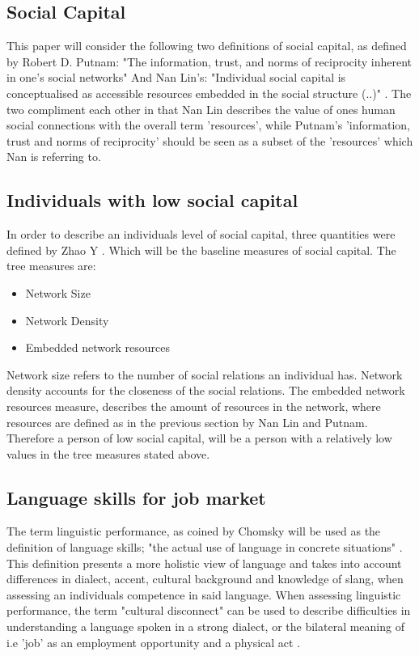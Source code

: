 \subsection{Social Capital}
This paper will consider the following two definitions of social capital, as defined by Robert D. Putnam: "The information, trust, and norms of reciprocity inherent in one's social networks" \cite{Putnam1995} And Nan Lin's: "Individual social capital is conceptualised as accessible resources embedded in the social structure (..)" \cite{Nan2001}. The two compliment each other in  that Nan Lin describes the value of ones human social connections with the overall term 'resources', while Putnam's 'information, trust and norms of reciprocity' should be seen as a subset of the 'resources' which Nan is referring to. 

\subsection{Individuals with low social capital} In order to describe an individuals level of social capital, three quantities were defined by Zhao Y \cite{Zhao2002}. Which will be the baseline measures of social capital. The tree measures are:
\begin{itemize}
    \item Network Size
    \item Network Density
    \item Embedded network resources
\end{itemize}Network size refers to the number of social relations an individual has. Network density accounts for the closeness of the social relations. The embedded network resources measure, describes the amount of resources in the network, where resources are defined as in the previous section by Nan Lin and Putnam. Therefore a person of low social capital, will be a person with a relatively low values in the tree measures stated above.

\subsection{Language skills for job market}
The term linguistic performance, as coined by Chomsky will be used as the definition of language skills; "the actual use of language in concrete situations" \cite{Chomsky1965}. This definition presents a more holistic view of language and takes into account differences in dialect, accent, cultural background and knowledge of slang, when assessing an individuals competence in said language. When assessing linguistic performance, the term "cultural disconnect" can be used to describe difficulties in understanding a language spoken in a strong dialect, or the bilateral meaning of i.e 'job' as an employment opportunity and a physical act \cite{Thakkar}.

